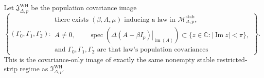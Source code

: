 Let \(\mathfrak J_{\Delta,p}^{\mathrm{WH}}\) be the population covariance image
\[
 \left\{(\Gamma_0,\Gamma_1,\Gamma_2):\begin{array}{l}
 \text{there exists }(\beta,A,\mu)\text{ inducing a law in }\mathcal M_{\Delta,p}^{\mathrm{stab}},\\
 A\neq0,\qquad
 \operatorname{spec}\!\left(\left.\Delta(A-\beta I_p)\right|_{\operatorname{im}(A)}\right)
 \subset\{z\in\mathbb C:|\operatorname{Im}z|<\pi\},\\
 \text{and }\Gamma_0,\Gamma_1,\Gamma_2\text{ are that law's population covariances}
 \end{array}\right\}.
\]
This is the covariance-only image of exactly the same nonempty stable restricted-strip regime as \(\mathfrak I_{\Delta,p}^{\mathrm{WH}}\).